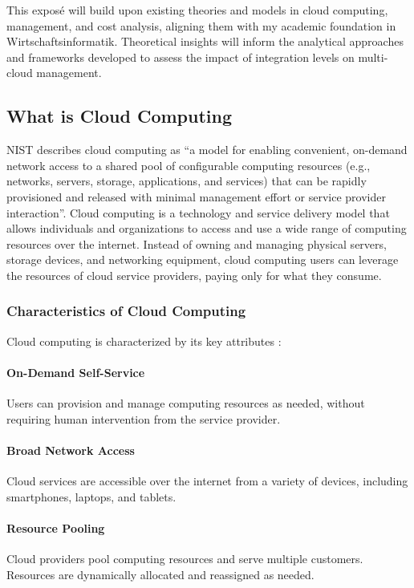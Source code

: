 This exposé will build upon existing theories and models in cloud computing, management, and cost analysis, 
aligning them with my academic foundation in Wirtschaftsinformatik. 
Theoretical insights will inform the analytical approaches and frameworks developed to assess the impact of integration levels on multi-cloud management.

\subsection{What is Cloud Computing}
NIST \cite{NISTCloudComputing} describes cloud computing as 
“a model for enabling convenient, on-demand network access to a shared pool of configurable computing resources 
(e.g., networks, servers, storage, applications, and services) that can be rapidly provisioned 
and released with minimal management effort or service provider interaction”.
Cloud computing is a technology and service delivery model that allows individuals and organizations to access and use a wide range of computing resources over the internet. 
Instead of owning and managing physical servers, storage devices, and networking equipment, 
cloud computing users can leverage the resources of cloud service providers, paying only for what they consume. 

\subsubsection{Characteristics of Cloud Computing}
Cloud computing is characterized by its key attributes \cite{oliveCloudComputingCharacteristics} \cite{gongCharacteristicsCloudComputing2010}:

\paragraph{On-Demand Self-Service}
Users can provision and manage computing resources as needed, without requiring human intervention from the service provider.

\paragraph{Broad Network Access}
Cloud services are accessible over the internet from a variety of devices, including smartphones, laptops, and tablets.

\paragraph{Resource Pooling}
Cloud providers pool computing resources and serve multiple customers. 
Resources are dynamically allocated and reassigned as needed.

